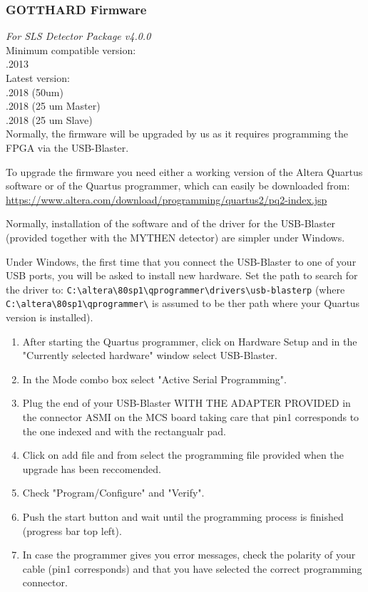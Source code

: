 \documentclass{article}
\begin{document}
\subsubsection{GOTTHARD Firmware}
\textit{For SLS Detector Package v4.0.0} \\
\indent Minimum compatible version: \\
\indent {}.2013 \\
\indent Latest version:	\\
\indent {}.2018 (50um) \\
\indent {}.2018 (25 um Master) \\
\indent {}.2018 (25 um Slave) \\

Normally, the firmware will be upgraded by us as it requires programming the
FPGA via the USB-Blaster.


To upgrade the firmware you need either a working version of the Altera
Quartus software or of the Quartus programmer, which can easily be downloaded
from: \\
\url{https://www.altera.com/download/programming/quartus2/pq2-index.jsp}


Normally, installation of the software and of the driver for the
USB-Blaster (provided together with the MYTHEN detector) are simpler under
Windows.


Under Windows, the first time that you connect the USB-Blaster to one
of your USB ports, you will be asked to install new hardware. Set the path to
search for the driver to:
\verb=C:\altera\80sp1\qprogrammer\drivers\usb-blasterp= (where 
\verb=C:\altera\80sp1\qprogrammer\= is assumed to be ther path where your
Quartus version is installed).
\begin{enumerate}
\item After starting the Quartus programmer, click on Hardware Setup and in the
"Currently selected hardware" window select USB-Blaster.
\item In the Mode combo box select "Active Serial Programming".
\item Plug the end of your USB-Blaster WITH THE ADAPTER PROVIDED in the
connector ASMI on the MCS board taking care that pin1 corresponds to the one
indexed and with the rectangualr pad.
\item Click on add file and from select the programming file provided when
the upgrade has been reccomended.
\item Check "Program/Configure" and "Verify".
\item Push the start button and wait until the programming process is
finished (progress bar top left).
\item In case the programmer gives you error messages, check the polarity of
your cable (pin1 corresponds) and that you have selected the correct programming
connector.
\end{enumerate}
\end{document}
